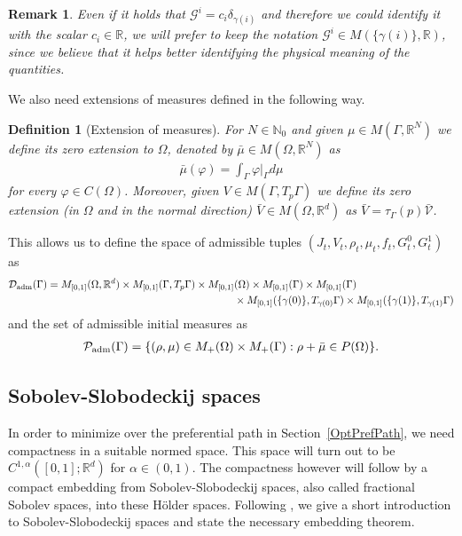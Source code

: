 \documentclass{article}
\def\R{{\mathbb R}}
\newtheorem{definition}[theorem]{Definition}
\newtheorem{remark}[theorem]{Remark}
\begin{document}
\begin{remark}
Even if it holds that  $\mathcal{G}^i = c_i\delta_{\gamma(i)}$ and therefore we could identify it with the scalar $c_i \in \R$, we will prefer to keep the notation $\mathcal{G}^i \in  M(\{\gamma(i)\}, \R)$, since we believe that it helps better identifying the physical meaning of the quantities. 
\end{remark}

We also need extensions of measures defined in the following way.

\begin{definition}[Extension of measures]
\label{def:ex}
For $N \in \mathbb{N}_0$ and given $\mu \in M(\Gamma, \R^N)$ we define its zero extension to $\Omega$, denoted by $\bar \mu \in M(\Omega, \R^N)$ as
\begin{align*}
\bar \mu (\varphi) = \int_\Gamma \varphi \big|_{\Gamma} d \mu 
\end{align*}
for every $\varphi \in C(\Omega)$. Moreover, given $V \in M(\Gamma, T_p\Gamma)$ we define its zero extension (in $\Omega$ and in the normal direction) $\bar V \in M(\Omega, \R^d)$ as $\bar V = \tau_\Gamma(p) \bar{\mathcal{V}}$.
\end{definition}

This allows us to define the space of admissible tuples
$(J_t,V_t,\rho_t,\mu_t,f_t,G_t^0,G^1_t)$ as 
\begin{align*}
    \mathcal{D}_{\rm adm}(\Gamma)= M_{[0,1]}(\Omega,\R^d) \times M_{[0,1]}(\Gamma,T_p\Gamma) \times M_{[0,1]}&(\Omega) \times M_{[0,1]}(\Gamma) \times 
    M_{[0,1]}(\Gamma) \\
    & \times M_{[0,1]}(\{\gamma(0)\}, T_{\gamma(0)} \Gamma) \times M_{[0,1]}(\{\gamma(1)\}, T_{\gamma(1)} \Gamma)
\end{align*}
and the set of admissible initial measures as 
\begin{align}
    \mathcal{P}_{\rm adm}(\Gamma) = \{(\rho,\mu) \in M_+(\Omega) \times M_+(\Gamma) : \rho + \bar \mu \in P(\Omega)\}.
\end{align}



\subsection{Sobolev-Slobodeckij spaces}

In order to minimize over the preferential path in Section~\ref{OptPrefPath}, we need compactness in a suitable normed space. This space will turn out to be $C^{1,\alpha}([0,1];\R^d)$ for $\alpha\in (0,1)$. The compactness however will follow by a compact embedding from Sobolev-Slobodeckij spaces, also called fractional Sobolev spaces, into these Hölder spaces. Following \cite{DINEZZA2012521}, we give a short introduction to Sobolev-Slobodeckij spaces and state the necessary embedding theorem. 
\end{document}
